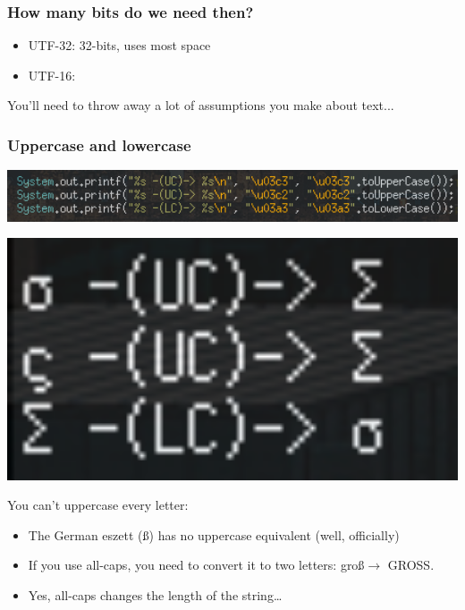 \documentclass[%
        hyperref={%
                pdfauthor={Zakariyya Mughal},%
                pdfpagemode={None},pdfpagelayout={SinglePage}}%
        xcolor={x11names},%
]{beamer}
\begin{document}
\begin{frame}
\frametitle{How many bits do we need then?}
\begin{itemize}
	\item UTF-32: 32-bits, uses most space
	\item UTF-16:
\end{itemize}
\end{frame}

\begin{frame}
\begin{center}
You'll need to throw away a lot of assumptions you make about text...
\end{center}
\end{frame}

\begin{frame}
\frametitle{Uppercase and lowercase}
\begin{center}
\begin{minipage}{0.9\textwidth}
\includegraphics[width=1\textwidth]{gfx/java-uc-lc.png}
\end{minipage}
\end{center}

\bigskip

\begin{center}
\begin{minipage}{0.3\textwidth}
\includegraphics[width=1\textwidth]{gfx/java-uc-lc-out.png}
\end{minipage}
\end{center}
\end{frame}

\begin{frame}
You can't uppercase every letter:
\begin{itemize}
\item The German eszett (\ss) has no uppercase equivalent (well, officially)
\item If you use all-caps, you need to convert it to two letters:
gro\ss $\rightarrow$ GROSS.

\pause\item Yes, all-caps changes the length of the string\ldots
\end{itemize}
\end{frame}
\end{document}

